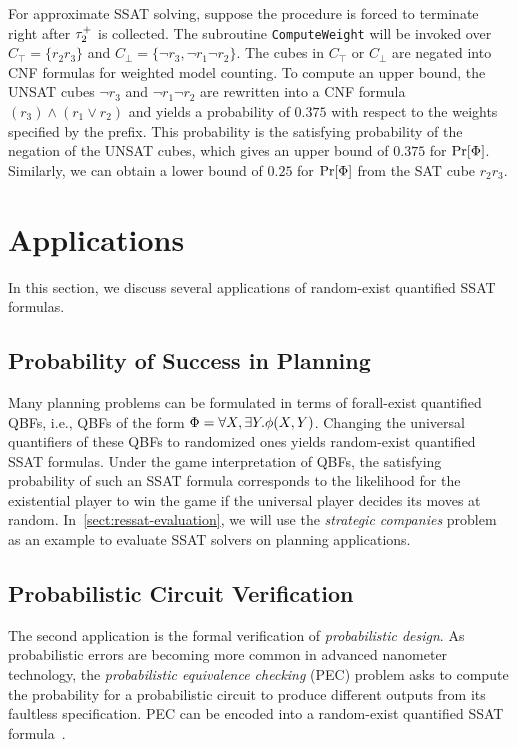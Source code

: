 \begin{example}
    For approximate SSAT solving, suppose the procedure is forced to terminate right after $\tau_2^+$ is collected.
    The subroutine \texttt{ComputeWeight} will be invoked over $C_\top=\{r_2r_3\}$ and $C_\bot=\{\lnot r_3,\lnot r_1 \lnot r_2\}$.
    The cubes in $C_\top$ or $C_\bot$ are negated into CNF formulas for weighted model counting.
    To compute an upper bound,
    the UNSAT cubes $\lnot r_3$ and $\lnot r_1 \lnot r_2$ are rewritten into a CNF formula $(r_3)\land(r_1 \lor r_2)$ and yields a probability of $0.375$ with respect to the weights specified by the prefix.
    This probability is the satisfying probability of the negation of the UNSAT cubes,
    which gives an upper bound of $0.375$ for $\Pr[\Phi]$.
    Similarly, we can obtain a lower bound of $0.25$ for $\Pr[\Phi]$ from the SAT cube $r_2 r_3$.
\end{example}

\section{Applications}
In this section, we discuss several applications of random-exist quantified SSAT formulas.

\subsection{Probability of Success in Planning}
Many planning problems can be formulated in terms of forall-exist quantified QBFs,
i.e., QBFs of the form $\Phi=\forall X,\exists Y.\phi(X,Y)$.
Changing the universal quantifiers of these QBFs to randomized ones yields random-exist quantified SSAT formulas.
Under the game interpretation of QBFs,
the satisfying probability of such an SSAT formula corresponds to the likelihood
for the existential player to win the game if the universal player decides its moves at random.
In~\cref{sect:ressat-evaluation},
we will use the \textit{strategic companies} problem~\cite{Cadoli1997} as an example
to evaluate SSAT solvers on planning applications.

\subsection{Probabilistic Circuit Verification}
The second application is the formal verification of \textit{probabilistic design}.
As probabilistic errors are becoming more common in advanced nanometer technology,
the \textit{probabilistic equivalence checking} (PEC) problem asks to compute the probability for a probabilistic circuit to produce different outputs from its faultless specification.
PEC can be encoded into a random-exist quantified SSAT formula~\cite{LeeTC18ProbDesign}.

